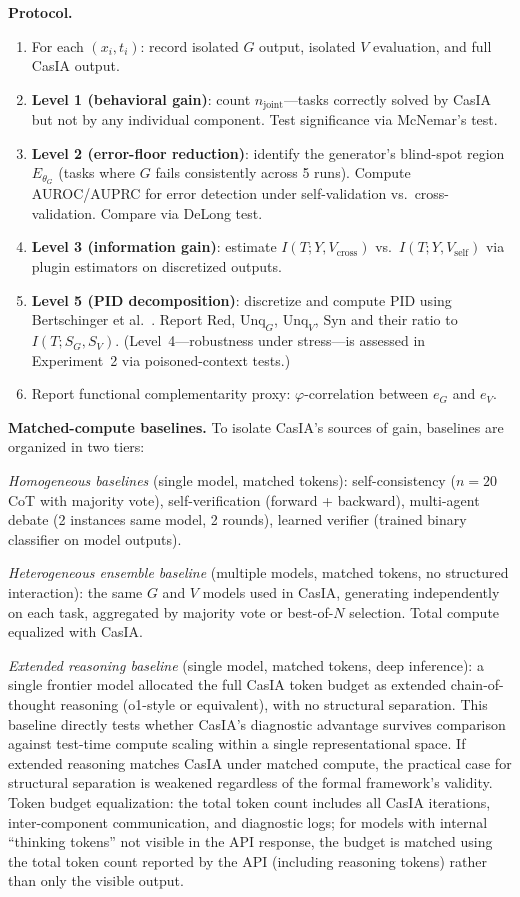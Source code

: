 \documentclass[11pt,a4paper]{article}
\theoremstyle{definition}
\newcommand{\thetaG}{\theta_G}
\begin{document}
\textbf{Protocol.}
\begin{enumerate}[leftmargin=*,itemsep=2pt]
\item For each $(x_i, t_i)$: record isolated $G$ output, isolated $V$ evaluation, and full CasIA output.
\item \textbf{Level 1 (behavioral gain)}: count $n_\text{joint}$---tasks correctly solved by CasIA but not by any individual component. Test significance via McNemar's test.
\item \textbf{Level 2 (error-floor reduction)}: identify the generator's blind-spot region $E_{\thetaG}$ (tasks where $G$ fails consistently across 5 runs). Compute AUROC/AUPRC for error detection under self-validation vs.\ cross-validation. Compare via DeLong test.
\item \textbf{Level 3 (information gain)}: estimate $I(T; Y, V_\text{cross})$ vs.\ $I(T; Y, V_\text{self})$ via plugin estimators on discretized outputs.
\item \textbf{Level 5 (PID decomposition)}: discretize and compute PID using Bertschinger et al.~\cite{bertschinger2014pid}. Report $\mathrm{Red}$, $\mathrm{Unq}_G$, $\mathrm{Unq}_V$, $\mathrm{Syn}$ and their ratio to $I(T; S_G, S_V)$. (Level~4---robustness under stress---is assessed in Experiment~2 via poisoned-context tests.)
\item Report functional complementarity proxy: $\varphi$-correlation between $e_G$ and $e_V$.
\end{enumerate}

\textbf{Matched-compute baselines.} To isolate CasIA's sources of gain, baselines are organized in two tiers:

\emph{Homogeneous baselines} (single model, matched tokens): self-consistency ($n=20$ CoT with majority vote), self-verification (forward + backward), multi-agent debate (2 instances same model, 2 rounds), learned verifier (trained binary classifier on model outputs).

\emph{Heterogeneous ensemble baseline} (multiple models, matched tokens, no structured interaction): the same $G$ and $V$ models used in CasIA, generating independently on each task, aggregated by majority vote or best-of-$N$ selection. Total compute equalized with CasIA.

\emph{Extended reasoning baseline} (single model, matched tokens, deep inference): a single frontier model allocated the full CasIA token budget as extended chain-of-thought reasoning (o1-style or equivalent), with no structural separation. This baseline directly tests whether CasIA's diagnostic advantage survives comparison against test-time compute scaling within a single representational space. If extended reasoning matches CasIA under matched compute, the practical case for structural separation is weakened regardless of the formal framework's validity. Token budget equalization: the total token count includes all CasIA iterations, inter-component communication, and diagnostic logs; for models with internal ``thinking tokens'' not visible in the API response, the budget is matched using the total token count reported by the API (including reasoning tokens) rather than only the visible output.
\end{document}
